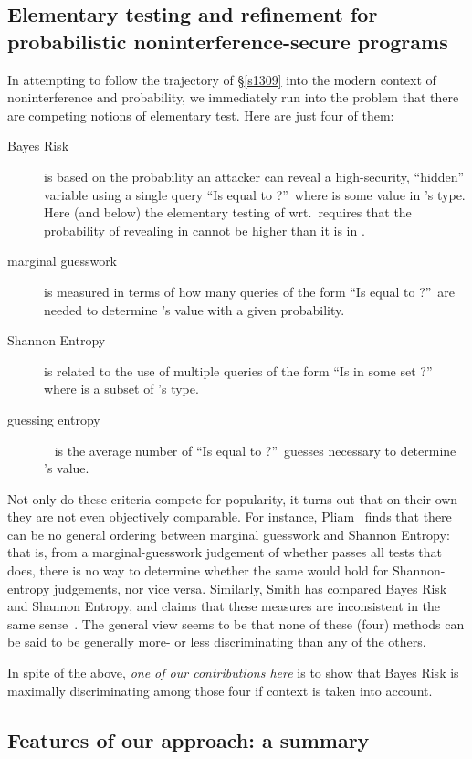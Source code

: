 \documentclass[runningheads]{llncs}
\newcommand\Sec[1] {Sec.~\ref{#1}}
\renewcommand\Sec[1] {\S\ref{#1}}
\begin{document}
\subsection{Elementary testing and refinement for probabilistic noninterference-secure programs}\label{s1028}
In attempting to follow the trajectory of \Sec{s1309} into the modern context of noninterference and probability, we immediately run into the problem that there are competing notions of elementary test. Here are just four of them:
\begin{description}
\item[Bayes Risk] \cite{Smith:07,Chatzikokolakis:07b,Braun:08,Braun:09} is based on the probability an attacker can reveal a high-security, ``hidden'' variable  using a single query ``Is  equal to ?''\ where  is some value in 's type. Here (and below) the elementary testing of  wrt.\  requires that the probability of revealing  in  cannot be higher than it is in .
\item[marginal guesswork] \cite{Pliam:00,Kopf:07} is measured in terms of how many queries of the form ``Is  equal to ?''\ are needed to determine 's value with a given probability.
\item[Shannon Entropy] \cite{Shannon:48} is related to the use of multiple queries of the form ``Is  in some set ?'' where  is a subset of 's type.
\item[guessing entropy]~\cite{Massey:94,Kopf:07} is the average number of ``Is  equal to ?''\ guesses necessary to determine 's value.
\end{description}
Not only do these criteria compete for popularity, it turns out that on their own they are not even objectively comparable. For instance,  Pliam~\cite{Pliam:00} finds that there can be no general ordering between marginal guesswork and Shannon Entropy: that is, from a marginal-guesswork judgement of whether  passes all tests that  does, there is no way to determine whether the same would hold for Shannon-entropy judgements, nor vice versa.
Similarly, Smith has compared Bayes Risk and Shannon Entropy, and claims that these measures are inconsistent in the same sense~\cite{Smith:07}. The general view seems to be that none of these (four) methods can be said to be generally more- or less discriminating than any of the others.

In spite of the above, \emph{one of our contributions here} is to show that Bayes Risk is maximally discriminating among those four if context is taken into account.

\subsection{Features of our approach: a summary}
\end{document}
